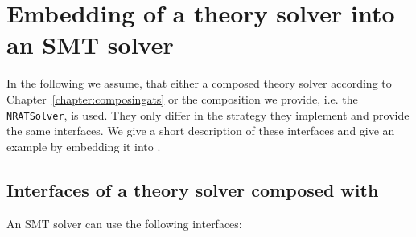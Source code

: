 \chapter{Embedding of a theory solver into an SMT solver}
\label{chapter:embeddingats}
In the following we assume, that either a composed theory solver according
to Chapter~\ref{chapter:composingats} or the composition we provide, i.e.
the \texttt{NRATSolver}, is used. They only differ in the strategy they implement
and provide the same interfaces. We give a short description of these
interfaces and give an example by embedding it into \Opensmt.

\section{Interfaces of a theory solver composed with \smtrat}
An SMT solver can use the following interfaces:
